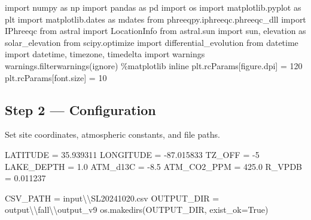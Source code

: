 \documentclass[
  letterpaper,
  DIV=11,
  numbers=noendperiod]{scrartcl}
\newenvironment{Shaded}{\begin{snugshade}}{\end{snugshade}}
\newcommand{\CharTok}[1]{\textcolor[rgb]{0.13,0.47,0.30}{#1}}
\newcommand{\DecValTok}[1]{\textcolor[rgb]{0.68,0.00,0.00}{#1}}
\newcommand{\FloatTok}[1]{\textcolor[rgb]{0.68,0.00,0.00}{#1}}
\newcommand{\ImportTok}[1]{\textcolor[rgb]{0.00,0.46,0.62}{#1}}
\newcommand{\NormalTok}[1]{\textcolor[rgb]{0.00,0.23,0.31}{#1}}
\newcommand{\OperatorTok}[1]{\textcolor[rgb]{0.37,0.37,0.37}{#1}}
\newcommand{\StringTok}[1]{\textcolor[rgb]{0.13,0.47,0.30}{#1}}
\newcommand{\VariableTok}[1]{\textcolor[rgb]{0.07,0.07,0.07}{#1}}
\begin{document}
\begin{Shaded}
\begin{Highlighting}[]
\ImportTok{import}\NormalTok{ numpy }\ImportTok{as}\NormalTok{ np}
\ImportTok{import}\NormalTok{ pandas }\ImportTok{as}\NormalTok{ pd}
\ImportTok{import}\NormalTok{ os}
\ImportTok{import}\NormalTok{ matplotlib.pyplot }\ImportTok{as}\NormalTok{ plt}
\ImportTok{import}\NormalTok{ matplotlib.dates }\ImportTok{as}\NormalTok{ mdates}
\ImportTok{from}\NormalTok{ phreeqpy.iphreeqc.phreeqc\_dll }\ImportTok{import}\NormalTok{ IPhreeqc}
\ImportTok{from}\NormalTok{ astral }\ImportTok{import}\NormalTok{ LocationInfo}
\ImportTok{from}\NormalTok{ astral.sun }\ImportTok{import}\NormalTok{ sun, elevation }\ImportTok{as}\NormalTok{ solar\_elevation}
\ImportTok{from}\NormalTok{ scipy.optimize }\ImportTok{import}\NormalTok{ differential\_evolution}
\ImportTok{from}\NormalTok{ datetime }\ImportTok{import}\NormalTok{ datetime, timezone, timedelta}
\ImportTok{import}\NormalTok{ warnings}
\NormalTok{warnings.filterwarnings(}\StringTok{\textquotesingle{}ignore\textquotesingle{}}\NormalTok{)}
\OperatorTok{\%}\NormalTok{matplotlib inline}
\NormalTok{plt.rcParams[}\StringTok{\textquotesingle{}figure.dpi\textquotesingle{}}\NormalTok{] }\OperatorTok{=} \DecValTok{120}
\NormalTok{plt.rcParams[}\StringTok{\textquotesingle{}font.size\textquotesingle{}}\NormalTok{] }\OperatorTok{=} \DecValTok{10}
\end{Highlighting}
\end{Shaded}

\subsection{Step 2 --- Configuration}\label{step-2-configuration}

Set site coordinates, atmospheric constants, and file paths.

\begin{Shaded}
\begin{Highlighting}[]
\NormalTok{LATITUDE      }\OperatorTok{=} \FloatTok{35.939311}
\NormalTok{LONGITUDE     }\OperatorTok{=} \OperatorTok{{-}}\FloatTok{87.015833}
\NormalTok{TZ\_OFF        }\OperatorTok{=} \OperatorTok{{-}}\DecValTok{5}
\NormalTok{LAKE\_DEPTH    }\OperatorTok{=} \FloatTok{1.0}
\NormalTok{ATM\_d13C      }\OperatorTok{=} \OperatorTok{{-}}\FloatTok{8.5}
\NormalTok{ATM\_CO2\_PPM   }\OperatorTok{=} \FloatTok{425.0}
\NormalTok{R\_VPDB        }\OperatorTok{=} \FloatTok{0.011237}

\NormalTok{CSV\_PATH   }\OperatorTok{=} \StringTok{\textquotesingle{}input}\CharTok{\textbackslash{}\textbackslash{}}\StringTok{SL20241020.csv\textquotesingle{}}
\NormalTok{OUTPUT\_DIR }\OperatorTok{=} \StringTok{\textquotesingle{}output}\CharTok{\textbackslash{}\textbackslash{}}\StringTok{fall}\CharTok{\textbackslash{}\textbackslash{}}\StringTok{output\_v9\textquotesingle{}}
\NormalTok{os.makedirs(OUTPUT\_DIR, exist\_ok}\OperatorTok{=}\VariableTok{True}\NormalTok{)}
\end{Highlighting}
\end{Shaded}
\end{document}
